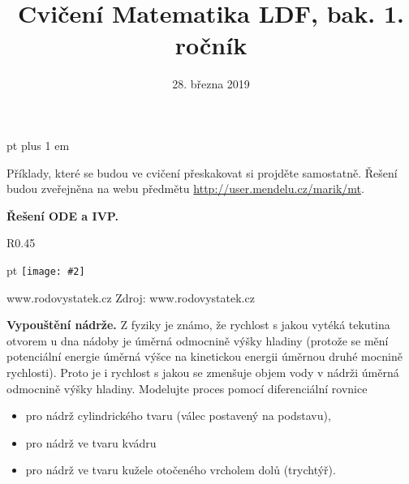 \documentclass{article}
\def\zlomek{0.45}
\def\nic{}
\newcommand\obrazek[2][pixabay.com]{
  \clearpage
  \def\test{#1}
\begin{wrapfigure}{R}{\zlomek\linewidth}
  \begin{minipage}{1.0\linewidth}\parskip 0 pt
  \texttt{[image: \#2]}

  \vspace*{-10pt}
  \ifx\test\nic\else
  \null\hfill{\color{gray}\footnotesize Zdroj: #1}
  \fi

  \mezera
  \end{minipage}
\end{wrapfigure}
}
\let\oldtextbf\textbf
\def\textbf#1{%
  \oldtextbf{\color{red} #1}}
\def\mezera{\vspace*{10pt}}
\begin{document}
 pt plus 1 em
\title{Cvičení Matematika LDF, bak. 1. ročník}
\date{28. března 2019}
\maketitle

Příklady, které se budou ve cvičení přeskakovat si projděte
samostatně. Řešení budou zveřejněna na webu předmětu \url{http://user.mendelu.cz/marik/mt}.

\newpage


\def\tg{\mathop{\mathrm{tg}}}
\def\cotg{\mathop{\mathrm{cotg}}}
\def\arctg{\mathop{\mathrm{arctg}}}


\textbf{Řešení ODE a IVP.} 



\newpage


\obrazek[www.rodovystatek.cz]{voda_plastovky.jpg}


\textbf{Vypouštění nádrže.} Z fyziky je známo, že rychlost s jakou
vytéká tekutina otvorem u dna nádoby je úměrná odmocnině výšky hladiny
(protože se mění potenciální energie úměrná výšce na kinetickou
energii úměrnou druhé mocnině rychlosti). Proto je i rychlost s jakou
se zmenšuje objem vody v nádrži úměrná odmocnině výšky
hladiny. Modelujte proces pomocí diferenciální rovnice
\begin{itemize}
\item pro nádrž
cylindrického tvaru (válec postavený na podstavu), 
\item pro nádrž ve tvaru
kvádru 
\item pro nádrž ve tvaru kužele otočeného vrcholem dolů (trychtýř).
\end{itemize}
\end{document}
